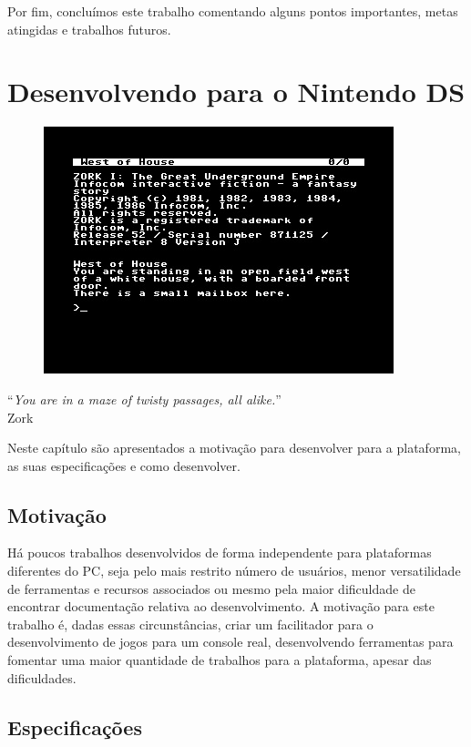 \documentclass[brazil]{abnt}
\begin{document}
Por fim, concluímos este trabalho comentando alguns pontos importantes, metas atingidas e trabalhos futuros.

\chapter{Desenvolvendo para o Nintendo DS\label{cap:hardds}}

\vfill{}
\begin{flushright}{}
\begin{figure}[h!]
\hfill\includegraphics{imgs/zork.jpg}
\end{figure}
``\emph{You are in a maze of twisty passages, all alike.}''\\
{\small Zork}\end{flushright}{\small \par}
\vfill{}

Neste capítulo são apresentados a motivação para desenvolver para a plataforma, as suas especificações e como desenvolver.
\newpage

\section{Motivação}

Há poucos trabalhos desenvolvidos de forma independente para plataformas diferentes do PC, seja pelo mais restrito número de usuários, menor versatilidade de ferramentas e recursos associados ou mesmo pela maior dificuldade de encontrar documentação relativa ao desenvolvimento. A motivação para este trabalho é, dadas essas circunstâncias, criar um facilitador para o desenvolvimento de jogos para um console real, desenvolvendo ferramentas para fomentar uma maior quantidade de trabalhos para a plataforma, apesar das dificuldades.

\section{Especificações}
\end{document}
